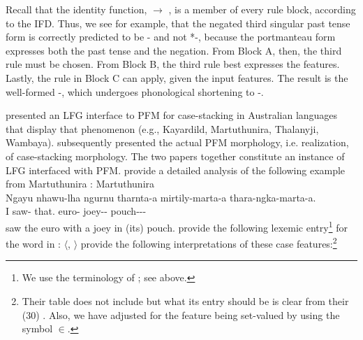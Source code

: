 \documentclass[output=paper,hidelinks]{langscibook}
\begin{document}
\z
%
Recall that the identity function,  $\longrightarrow$ ,
is a member of every rule block, according to the IFD. Thus, we see
for example, that the negated third singular past tense form is correctly predicted
to be - and not *-, because
the portmanteau form  expresses both the past tense and the
negation. From Block A, then, the third rule must be chosen. From
Block B, the third rule best expresses the features. Lastly, the
rule in Block C can apply, given the input features. The result is the
well-formed -, which undergoes phonological
shortening to -. 

\citet{sadler-nordlinger2004} presented an LFG interface to PFM for
case-stack\-ing in Australian languages that display that phenomenon
(e.g., Kayardild, Martuthunira, Thalanyji, Wambaya). \citet{SadlNord2006}
subsequently presented the actual PFM morphology, i.e. realization, of
case-stacking morphology. The two papers together constitute an
instance of LFG interfaced with
PFM. \citet[172--180]{sadler-nordlinger2004} provide a detailed
analysis of the following example from Martuthunira
\citep[60,~(3.15)]{dench1995}:
%
\ea \label{ex:sad-nor} Martuthunira\\
\gll
    Ngayu nhawu-lha ngurnu tharnta-a mirtily-marta-a thara-ngka-marta-a. \\
    I saw- that. euro-
    joey--
    pouch---\\
 saw the euro with a joey in (its) pouch.
\z
%
\citet[174,~(28)]{sadler-nordlinger2004} provide the following lexemic
entry\footnote{We use the terminology of \citealt{dalrymple15}; see
   above.} for the word
 in :
%
\ea
$\langle$, $\rangle$
\z
%
\citet[174,~(25)]{sadler-nordlinger2004} provide the following interpretations of
these case features:\footnote{Their table does not include 
  but what its entry should be is clear from their (30)
  \citep[175]{sadler-nordlinger2004}. Also, we have adjusted for the
  feature  being set-valued by using the symbol $\in$.}
%
\ea 
\end{document}
